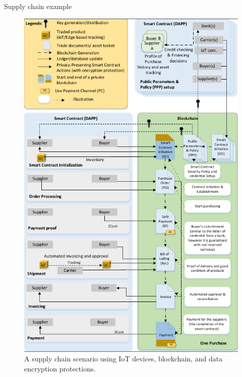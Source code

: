 \documentclass[11pt]{beamer}
\begin{document}
\begin{frame}{Supply chain example}
\begin{figure}[!ht]
\includegraphics[scale=0.21]{supplychainexample.png}
\caption{A supply chain scenario using IoT devices, blockchain, and data encryption protections.}
\label{fig:supplychain}
\end{figure}
\end{frame}
\end{document}
